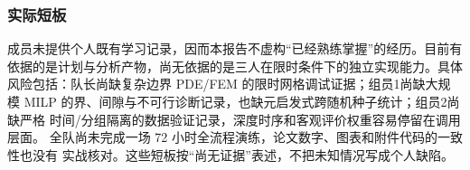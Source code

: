 \subsubsection{实际短板}

成员未提供个人既有学习记录，因而本报告不虚构“已经熟练掌握”的经历。目前有
依据的是计划与分析产物，尚无依据的是三人在限时条件下的独立实现能力。具体
风险包括：队长尚缺复杂边界 PDE/FEM 的限时网格调试证据；组员1尚缺大规模
MILP 的界、间隙与不可行诊断记录，也缺元启发式跨随机种子统计；组员2尚缺严格
时间/分组隔离的数据验证记录，深度时序和客观评价权重容易停留在调用层面。
全队尚未完成一场 72 小时全流程演练，论文数字、图表和附件代码的一致性也没有
实战核对。这些短板按“尚无证据”表述，不把未知情况写成个人缺陷。

